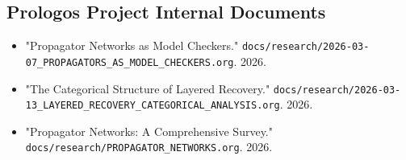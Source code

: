 \documentclass[11pt]{article}
\begin{document}
\subsection{Prologos Project Internal Documents}
\label{sec:org812b1eb}
\begin{itemize}
\item "Propagator Networks as Model Checkers." \texttt{docs/research/2026-03-07\_PROPAGATORS\_AS\_MODEL\_CHECKERS.org}. 2026.
\item "The Categorical Structure of Layered Recovery." \texttt{docs/research/2026-03-13\_LAYERED\_RECOVERY\_CATEGORICAL\_ANALYSIS.org}. 2026.
\item "Propagator Networks: A Comprehensive Survey." \texttt{docs/research/PROPAGATOR\_NETWORKS.org}. 2026.
\end{itemize}
\end{document}
